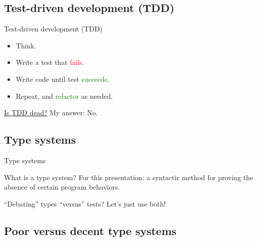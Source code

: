 \subsection{Test-driven development (TDD)}

\begin{frame}{Test-driven development (TDD)}
  \begin{itemize}
  \item Think.
  \item Write a test that \textcolor{red}{fails}.
  \item Write code until test \textcolor{green}{succeeds}.
  \item Repeat, and \textcolor{green}{refactor} as needed.
  \end{itemize}

  \begin{block}{\href{http://martinfowler.com/articles/is-tdd-dead/}{Is TDD dead?}}
    My answer: No.
  \end{block}
\end{frame}

\subsection{Type systems}

\begin{frame}{Type systems}
  \begin{block}{What is a type system?}
    For this presentation: a \alert{syntactic} method for \alert{proving} the absence of certain program behaviors.
  \end{block}

  \begin{block}{``Debating'' types ``versus'' tests?}
    Let's just use both!
  \end{block}
\end{frame}

\subsection{Poor versus decent type systems}

